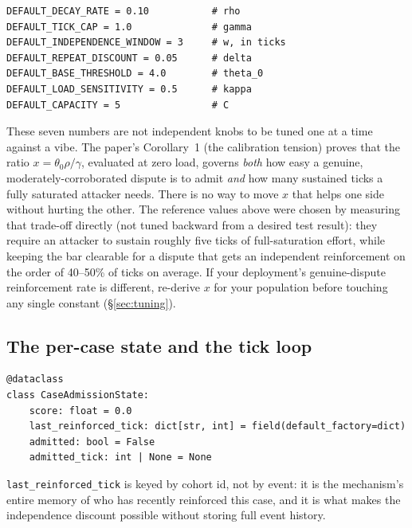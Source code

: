 \documentclass[11pt]{article}
\begin{document}
\begin{lstlisting}
DEFAULT_DECAY_RATE = 0.10           # rho
DEFAULT_TICK_CAP = 1.0              # gamma
DEFAULT_INDEPENDENCE_WINDOW = 3     # w, in ticks
DEFAULT_REPEAT_DISCOUNT = 0.05      # delta
DEFAULT_BASE_THRESHOLD = 4.0        # theta_0
DEFAULT_LOAD_SENSITIVITY = 0.5      # kappa
DEFAULT_CAPACITY = 5                # C
\end{lstlisting}

These seven numbers are not independent knobs to be tuned one at a time
against a vibe. The paper's Corollary~1 (the calibration tension) proves
that the ratio $x = \theta_0\rho/\gamma$, evaluated at zero load, governs
\emph{both} how easy a genuine, moderately-corroborated dispute is to
admit \emph{and} how many sustained ticks a fully saturated attacker
needs. There is no way to move $x$ that helps one side without hurting
the other. The reference values above were chosen by measuring that
trade-off directly (not tuned backward from a desired test result): they
require an attacker to sustain roughly five ticks of full-saturation
effort, while keeping the bar clearable for a dispute that gets an
independent reinforcement on the order of 40--50\% of ticks on average.
If your deployment's genuine-dispute reinforcement rate is different,
re-derive $x$ for your population before touching any single constant
(\S\ref{sec:tuning}).

\subsection{The per-case state and the tick loop}

\begin{lstlisting}
@dataclass
class CaseAdmissionState:
    score: float = 0.0
    last_reinforced_tick: dict[str, int] = field(default_factory=dict)
    admitted: bool = False
    admitted_tick: int | None = None
\end{lstlisting}

\texttt{last\_reinforced\_tick} is keyed by cohort id, not by event: it
is the mechanism's entire memory of who has recently reinforced this
case, and it is what makes the independence discount possible without
storing full event history.
\end{document}

